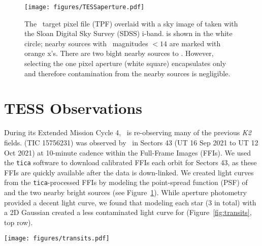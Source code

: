 \documentclass[twocolumn]{aastex631}
\begin{document}
\begin{figure}[!ht]
\begin{center}
\texttt{[image: figures/TESSaperture.pdf]}%
\caption{The \tess\ target pixel file (TPF) overlaid with a sky image of \sname taken with the Sloan Digital Sky Survey (SDSS) i-band. \sname is shown in the white circle; nearby sources with \tess\ magnitudes $< 14$ are marked with orange x's. There are two bight nearby sources to \sname. However, selecting the one pixel aperture (white square) encapsulates only \sname and therefore contamination from the nearby sources is negligible.} \label{fig:tpf}
\end{center}
\end{figure}

\section{TESS Observations} \label{sec:observations}

During its Extended Mission Cycle 4, \tess\ is re-observing many of the previous \textit{K2} fields. \sname (TIC 15756231) was observed by \tess\ in Sectors 43 (UT 16 Sep 2021 to UT 12 Oct 2021) at 10-minute cadence within the Full-Frame Images (FFIs). We used the \texttt{tica} \citep{fausnaugh20} software to download calibrated FFIs each orbit for Sectors 43, as these FFIs are quickly available after the data is down-linked. We created light curves from the \texttt{tica}-processed FFIs by modeling the point-spread function (PSF) of \sname and the two nearby bright sources (see Figure~\ref{fig:tpf}). While aperture photometry provided a decent light curve, we found that modeling each star (3 in total) with a 2D Gaussian created a less contaminated light curve for \sname (Figure~\ref{fig:transits}, top row). 




\begin{figure*}[!ht]
\begin{center}
\texttt{[image: figures/transits.pdf]}
\caption{\sname extracted light curve from the \texttt{tica}-processed full-frame images, with transits of \allplanets highlighted by color. Top row: extracted light curve with over plotted with our best-fit GP model for stellar variability (blue). Middle row: the \tess\ light curve with the stellar variability removed by our model. Bottom rows: zoomed-in regions around the visible transits during the first orbit (third row) and second orbit (last row) from \tess\ Sector 43.} 
\label{fig:transits}
\end{center}
\end{figure*}
\end{document}
